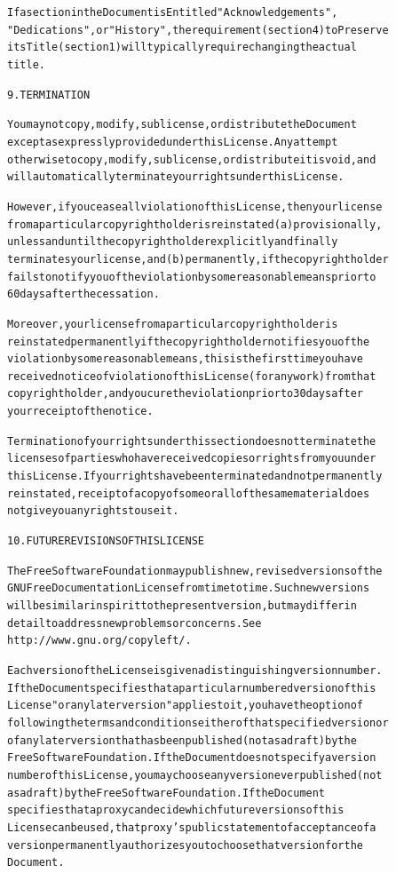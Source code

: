 \documentclass[DIV=12,%
               BCOR=0mm,%
               fontsize=10pt,%
               oneside,%
               paper=210mm:11in]{scrbook}
\begin{document}
\begin{alltt}
If a section in the Document is Entitled "Acknowledgements",
"Dedications", or "History", the requirement (section 4) to Preserve
its Title (section 1) will typically require changing the actual
title.


9. TERMINATION

You may not copy, modify, sublicense, or distribute the Document
except as expressly provided under this License.  Any attempt
otherwise to copy, modify, sublicense, or distribute it is void, and
will automatically terminate your rights under this License.

However, if you cease all violation of this License, then your license
from a particular copyright holder is reinstated (a) provisionally,
unless and until the copyright holder explicitly and finally
terminates your license, and (b) permanently, if the copyright holder
fails to notify you of the violation by some reasonable means prior to
60 days after the cessation.

Moreover, your license from a particular copyright holder is
reinstated permanently if the copyright holder notifies you of the
violation by some reasonable means, this is the first time you have
received notice of violation of this License (for any work) from that
copyright holder, and you cure the violation prior to 30 days after
your receipt of the notice.

Termination of your rights under this section does not terminate the
licenses of parties who have received copies or rights from you under
this License.  If your rights have been terminated and not permanently
reinstated, receipt of a copy of some or all of the same material does
not give you any rights to use it.


10. FUTURE REVISIONS OF THIS LICENSE

The Free Software Foundation may publish new, revised versions of the
GNU Free Documentation License from time to time.  Such new versions
will be similar in spirit to the present version, but may differ in
detail to address new problems or concerns.  See
http://www.gnu.org/copyleft/.

Each version of the License is given a distinguishing version number.
If the Document specifies that a particular numbered version of this
License "or any later version" applies to it, you have the option of
following the terms and conditions either of that specified version or
of any later version that has been published (not as a draft) by the
Free Software Foundation.  If the Document does not specify a version
number of this License, you may choose any version ever published (not
as a draft) by the Free Software Foundation.  If the Document
specifies that a proxy can decide which future versions of this
License can be used, that proxy's public statement of acceptance of a
version permanently authorizes you to choose that version for the
Document.


\end{alltt}
\end{document}
